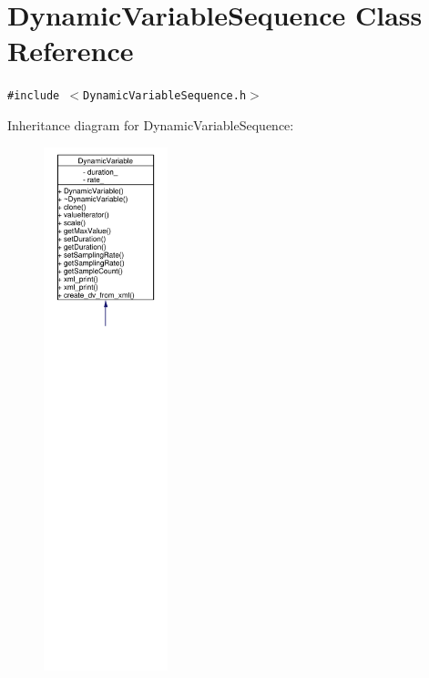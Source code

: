 \hypertarget{classDynamicVariableSequence}{
\section{Dynamic\-Variable\-Sequence Class Reference}
\label{classDynamicVariableSequence}
}
{\tt \#include $<$Dynamic\-Variable\-Sequence.h$>$}

Inheritance diagram for Dynamic\-Variable\-Sequence:\begin{figure}[H]
\begin{center}
\leavevmode
\includegraphics[width=102pt]{classDynamicVariableSequence__inherit__graph}
\end{center}
\end{figure}
